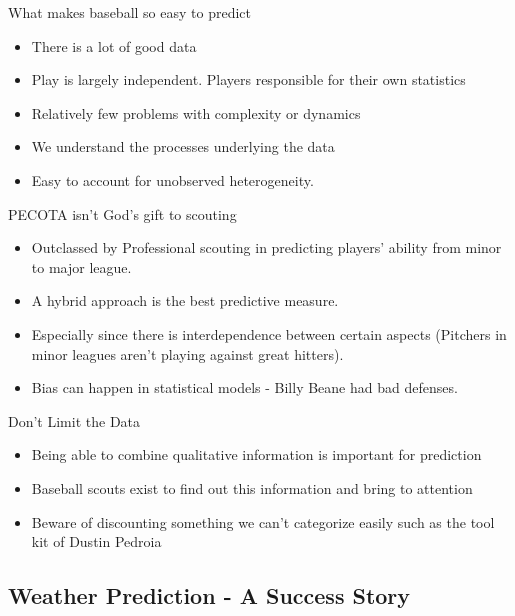 \documentclass[bigger]{beamer}
\begin{document}
\begin{frame}[label=sec-2-3-1]{What makes baseball so easy to predict}
\begin{itemize}
\item There is a lot of good data
\item Play is largely independent. Players responsible for their own
statistics
\item Relatively few problems with complexity or dynamics
\item We understand the processes underlying the data
\item Easy to account for unobserved heterogeneity.
\end{itemize}
\end{frame}

\begin{frame}[label=sec-2-3-2]{PECOTA isn't God's gift to scouting}
\begin{itemize}
\item Outclassed by Professional scouting in predicting players' ability
from minor to major league.
\item A hybrid approach is the best predictive measure.
\item Especially since there is interdependence between certain aspects
(Pitchers in minor leagues aren't playing against great hitters).
\item Bias can happen in statistical models - Billy Beane had bad
defenses.
\end{itemize}
\end{frame}

\begin{frame}[label=sec-2-3-3]{Don't Limit the Data}
\begin{itemize}
\item Being able to combine qualitative information is important for
prediction
\item Baseball scouts exist to find out this information and bring to
attention
\item Beware of discounting something we can't categorize easily such as
the tool kit of Dustin Pedroia
\end{itemize}
\end{frame}

\subsection{Weather Prediction - A Success Story}
\label{sec-2-4}
\end{document}
